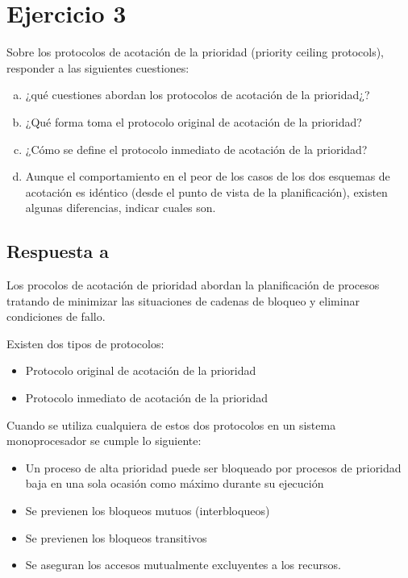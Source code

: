 \section{Ejercicio 3}

Sobre los protocolos de acotación de la prioridad (priority ceiling protocols),
responder a las siguientes cuestiones:
\begin{enumerate}[a)]
	\item ¿qué cuestiones abordan los protocolos de acotación de la
		prioridad¿?
	\item ¿Qué forma toma el protocolo original de acotación de la prioridad?
	\item ¿Cómo se define el protocolo inmediato de acotación de la prioridad?
	\item Aunque el comportamiento en el peor de los casos de los dos 
		esquemas de acotación es idéntico (desde el punto de vista de la 
		planificación), existen algunas diferencias, indicar cuales son.

\end{enumerate}

\subsection{Respuesta a}

Los procolos de acotación de prioridad abordan la planificación de procesos
tratando de minimizar las situaciones de cadenas de bloqueo y eliminar
condiciones de fallo.

Existen dos tipos de protocolos:

\begin{itemize}
	\item Protocolo original de acotación de la prioridad
	\item Protocolo inmediato de acotación de la prioridad
\end{itemize}

Cuando se utiliza cualquiera de estos dos protocolos en un sistema
monoprocesador se cumple lo siguiente:

\begin{itemize}
	\item Un proceso de alta prioridad puede ser bloqueado por procesos de
		prioridad baja en una sola ocasión como máximo durante su
		ejecución
	\item Se previenen los bloqueos mutuos (interbloqueos)
	\item Se previenen los bloqueos transitivos
	\item Se aseguran los accesos mutualmente excluyentes a los recursos.
\end{itemize}

